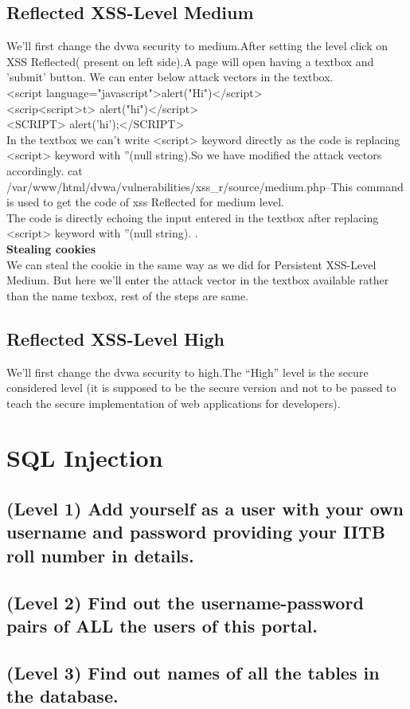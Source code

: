 \documentclass{article}
\begin{document}
\subsection{Reflected XSS-Level Medium}
We'll first change the dvwa security to medium.After setting the level click on XSS Reflected( present on left side).A page will open having a textbox and 'submit' button. We can enter below attack vectors in the textbox.\\
<script language="javascript">alert("Hi")</script>\\
<scrip<script>t> alert("hi")</script>\\
<SCRIPT> alert('hi');</SCRIPT>\\
In the textbox we can't write <script> keyword directly as the code is replacing <script> keyword with ''(null string).So we have modified the attack vectors accordingly.
cat /var/www/html/dvwa/vulnerabilities/xss\_r/source/medium.php--This command is used to get the code of xss Reflected for medium level.\\
The code is directly echoing the input entered in the textbox after replacing <script> keyword with ''(null string). .\\
\textbf{Stealing cookies}\\
We can steal the cookie in the same way as we did for Persistent XSS-Level Medium. But here we'll enter the attack vector in the textbox available rather than the name texbox, rest of the steps are same.
\subsection{Reflected XSS-Level High}
We'll first change the dvwa security to high.The “High” level is the secure considered level (it is supposed to be the secure version and not to be passed to teach the secure implementation of web applications for developers).

\section{SQL Injection}
\subsection{(Level 1) Add yourself as a user with your own username and password providing your IITB roll number in details.}
\subsection{(Level 2) Find out the username-password pairs of ALL the users of this portal.}
\subsection{(Level 3) Find out names of all the tables in the database.}
\end{document}
